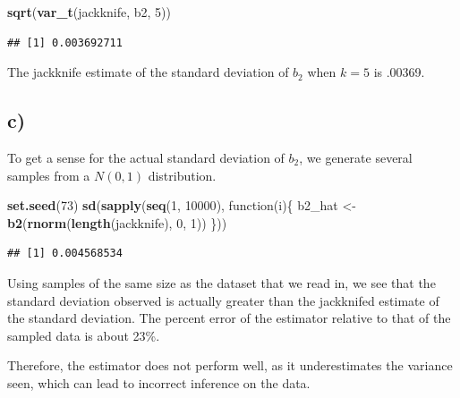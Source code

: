\documentclass[]{article}
\newenvironment{Shaded}{\begin{snugshade}}{\end{snugshade}}
\newcommand{\KeywordTok}[1]{\textcolor[rgb]{0.13,0.29,0.53}{\textbf{{#1}}}}
\newcommand{\DecValTok}[1]{\textcolor[rgb]{0.00,0.00,0.81}{{#1}}}
\newcommand{\StringTok}[1]{\textcolor[rgb]{0.31,0.60,0.02}{{#1}}}
\newcommand{\NormalTok}[1]{{#1}}
\begin{document}
\begin{Shaded}
\begin{Highlighting}[]
\KeywordTok{sqrt}\NormalTok{(}\KeywordTok{var_t}\NormalTok{(jackknife, b2, }\DecValTok{5}\NormalTok{))}
\end{Highlighting}
\end{Shaded}

\begin{verbatim}
## [1] 0.003692711
\end{verbatim}

The jackknife estimate of the standard deviation of \(b_2\) when \(k=5\)
is .00369.

\subsection{c)}\label{c-1}

To get a sense for the actual standard deviation of \(b_2\), we generate
several samples from a \(N(0, 1)\) distribution.

\begin{Shaded}
\begin{Highlighting}[]
\KeywordTok{set.seed}\NormalTok{(}\DecValTok{73}\NormalTok{)}
\KeywordTok{sd}\NormalTok{(}\KeywordTok{sapply}\NormalTok{(}\KeywordTok{seq}\NormalTok{(}\DecValTok{1}\NormalTok{, }\DecValTok{10000}\NormalTok{), function(i)\{}
  \NormalTok{b2_hat <-}\StringTok{ }\KeywordTok{b2}\NormalTok{(}\KeywordTok{rnorm}\NormalTok{(}\KeywordTok{length}\NormalTok{(jackknife), }\DecValTok{0}\NormalTok{, }\DecValTok{1}\NormalTok{))}
\NormalTok{\}))}
\end{Highlighting}
\end{Shaded}

\begin{verbatim}
## [1] 0.004568534
\end{verbatim}

Using samples of the same size as the dataset that we read in, we see
that the standard deviation observed is actually greater than the
jackknifed estimate of the standard deviation. The percent error of the
estimator relative to that of the sampled data is about 23\%.

Therefore, the estimator does not perform well, as it underestimates the
variance seen, which can lead to incorrect inference on the data.
\end{document}
